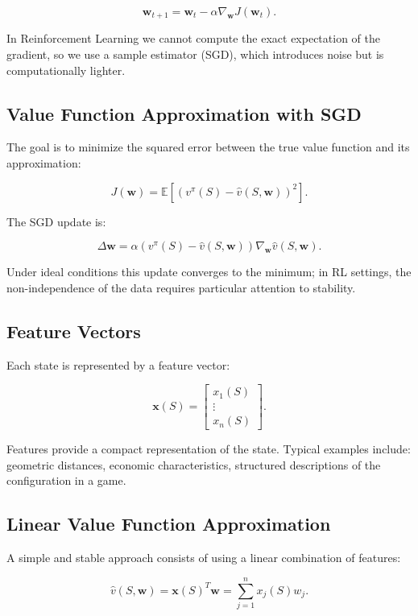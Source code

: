 \[
\mathbf{w}_{t+1} = \mathbf{w}_t - \alpha \nabla_{\mathbf{w}} J(\mathbf{w}_t).
\]

In Reinforcement Learning we cannot compute the exact expectation of the gradient, so we use a sample estimator (SGD), which introduces noise but is computationally lighter.

\subsection{Value Function Approximation with SGD}

The goal is to minimize the squared error between the true value function and its approximation:

\[
J(\mathbf{w})
=
\mathbb{E}\left[
\left( v^\pi(S) - \hat{v}(S,\mathbf{w}) \right)^2
\right].
\]

The SGD update is:

\[
\Delta \mathbf{w}
=
\alpha
\left( v^\pi(S) - \hat{v}(S,\mathbf{w}) \right)
\nabla_{\mathbf{w}}\hat{v}(S,\mathbf{w}).
\]

Under ideal conditions this update converges to the minimum; in RL settings, the non-independence of the data requires particular attention to stability.

\subsection{Feature Vectors}

Each state is represented by a feature vector:

\[
\mathbf{x}(S)
=
\begin{bmatrix}
x_1(S) \\
\vdots \\
x_n(S)
\end{bmatrix}.
\]

Features provide a compact representation of the state.
Typical examples include: geometric distances, economic characteristics, structured descriptions of the configuration in a game.

\subsection{Linear Value Function Approximation}

A simple and stable approach consists of using a linear combination of features:

\[
\hat{v}(S,\mathbf{w})
=
\mathbf{x}(S)^T \mathbf{w}
=
\sum_{j=1}^{n} x_j(S) w_j.
\]

